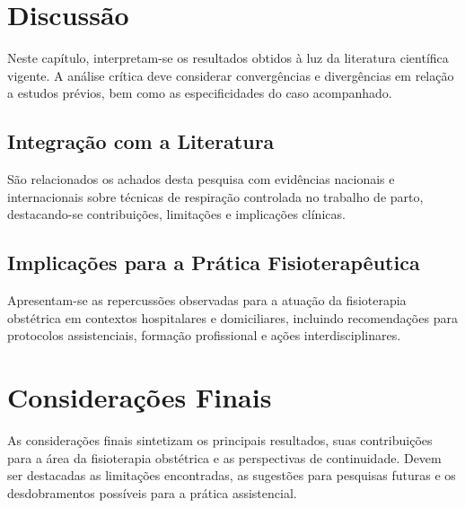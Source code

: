 \documentclass[openright]{tex/estilos/normas-utf-tex}
\begin{document}
\chapter{Discussão}
\label{chap:discussao}

Neste capítulo, interpretam-se os resultados obtidos à luz da literatura científica vigente. A análise crítica deve considerar convergências e divergências em relação a estudos prévios, bem como as especificidades do caso acompanhado.

\section{Integração com a Literatura}
\label{sec:integracao-literatura}

São relacionados os achados desta pesquisa com evidências nacionais e internacionais sobre técnicas de respiração controlada no trabalho de parto, destacando-se contribuições, limitações e implicações clínicas.

\section{Implicações para a Prática Fisioterapêutica}
\label{sec:implicacoes-pratica}

Apresentam-se as repercussões observadas para a atuação da fisioterapia obstétrica em contextos hospitalares e domiciliares, incluindo recomendações para protocolos assistenciais, formação profissional e ações interdisciplinares.

\chapter{Considerações Finais}
\label{chap:consideracoes-finais}

As considerações finais sintetizam os principais resultados, suas contribuições para a área da fisioterapia obstétrica e as perspectivas de continuidade. Devem ser destacadas as limitações encontradas, as sugestões para pesquisas futuras e os desdobramentos possíveis para a prática assistencial.


\end{document}
